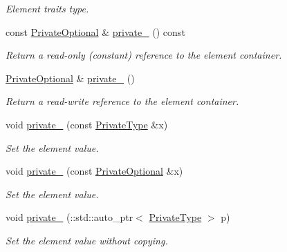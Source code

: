 \begin{DoxyCompactItemize}
\begin{DoxyCompactList}\small\item\em Element traits type. \item\end{DoxyCompactList}\item 
const \hyperlink{classopenstack_1_1xml_1_1Addresses_a63822dad44c10c954bc42c5af4d7aaaf}{PrivateOptional} \& \hyperlink{classopenstack_1_1xml_1_1Addresses_a66fc42d643c2de37631b5eda2b4e396d}{private\_\-} () const 
\begin{DoxyCompactList}\small\item\em Return a read-\/only (constant) reference to the element container. \item\end{DoxyCompactList}\item 
\hyperlink{classopenstack_1_1xml_1_1Addresses_a63822dad44c10c954bc42c5af4d7aaaf}{PrivateOptional} \& \hyperlink{classopenstack_1_1xml_1_1Addresses_a78037cf70dcdb0fffe505e0677c3168b}{private\_\-} ()
\begin{DoxyCompactList}\small\item\em Return a read-\/write reference to the element container. \item\end{DoxyCompactList}\item 
void \hyperlink{classopenstack_1_1xml_1_1Addresses_af8de8da1a35364d41953c5f072d2a52f}{private\_\-} (const \hyperlink{classopenstack_1_1xml_1_1AddressList}{PrivateType} \&x)
\begin{DoxyCompactList}\small\item\em Set the element value. \item\end{DoxyCompactList}\item 
void \hyperlink{classopenstack_1_1xml_1_1Addresses_a92f03dd6cb87187930dbb314210839da}{private\_\-} (const \hyperlink{classopenstack_1_1xml_1_1Addresses_a63822dad44c10c954bc42c5af4d7aaaf}{PrivateOptional} \&x)
\begin{DoxyCompactList}\small\item\em Set the element value. \item\end{DoxyCompactList}\item 
void \hyperlink{classopenstack_1_1xml_1_1Addresses_a8323e589b4841fa4d0d07dcd7c00fade}{private\_\-} (::std::auto\_\-ptr$<$ \hyperlink{classopenstack_1_1xml_1_1AddressList}{PrivateType} $>$ p)
\begin{DoxyCompactList}\small\item\em Set the element value without copying. \item\end{DoxyCompactList}\end{DoxyCompactItemize}
